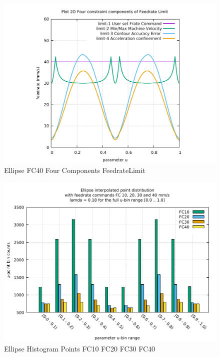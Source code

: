 \begin{figure}
	\caption     {Ellipse FC40 Four Components FeedrateLimit}
	\label{34-img-Ellipse-FC40-Four-Components-FeedrateLimit.pdf}
	\includegraphics[width=1.00\textwidth]{Chap4/appendix/app-Ellipse/plots/34-img-Ellipse-FC40-Four-Components-FeedrateLimit.pdf}
\end{figure}


\clearpage
\pagebreak

\begin{figure}
	\centering
	\caption     {Ellipse Histogram Points FC10 FC20 FC30 FC40}
	\label{35-img-Ellipse-Histogram-Points-FC10-FC20-FC30-FC40.pdf}
\includegraphics[width=1.00\textwidth]{Chap4/appendix/app-Ellipse/plots/35-img-Ellipse-Histogram-Points-FC10-FC20-FC30-FC40.pdf} 
\end{figure}


